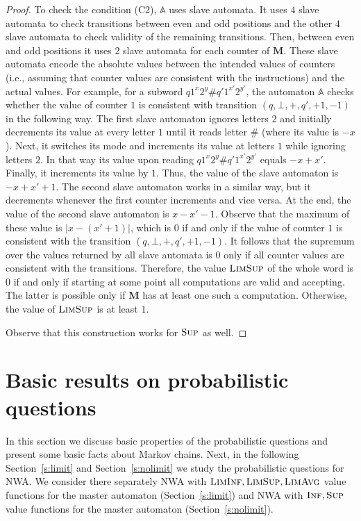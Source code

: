 \documentclass{lmcs}
\newcommand{\nestedA}{\mathbb{A}}
\newcommand{\flimavg}{\textsc{LimAvg}}
\newcommand{\fliminf}{\textsc{LimInf}}
\newcommand{\flimsup}{\textsc{LimSup}}
\newcommand{\fsup}{\textsc{Sup}}
\newcommand{\finf}{\textsc{Inf}}
\newcommand{\M}{\mathbf{M}}
\begin{document}
\begin{proof}
To check the condition (C2), $\nestedA$ uses slave automata.
It uses $4$ slave automata to check transitions between even and odd positions and the other $4$ slave automata to check validity of the remaining
transitions. Then, between even and odd positions it uses $2$ slave automata for each counter of $\M$.
These slave automata encode the absolute values between the intended values of counters (i.e., assuming that counter values are consistent with the instructions)
and the actual values.
For example, for a subword $q 1^x 2^y \# q' 1^{x'} 2^{y'}$, the automaton $\nestedA$ checks whether the value
of counter $1$ is consistent with transition $(q,\bot, +, q', +1, -1)$ in the following way.
The first slave automaton ignores letters $2$ and initially decrements its value at every letter $1$ until it reads letter $\#$ (where its value is $-x$).
Next, it switches its mode and increments its value at letters $1$ while ignoring letters $2$.
In that way its value upon reading $q 1^x 2^y \# q' 1^{x'} 2^{y'}$ equals $-x + x'$.
Finally, it increments its value by $1$.
Thus, the value of the slave automaton is $-x +x' +1$.
The second slave automaton works in a similar way, but it decrements whenever the first counter increments and vice versa.
 At the end, the value of the second slave automaton is
$x - x' -1$. Observe that the maximum of these value is $|x - (x'+1)|$, which is $0$ if and only if the value of counter $1$ is consistent with the transition
 $(q,\bot, +, q', +1, -1)$. It follows that the supremum over the values returned by all slave automata is $0$ only if all counter values are consistent with the transitions.
Therefore, the value $\flimsup$ of the whole word  is $0$ if and only if starting at some point all computations are valid and accepting.
The latter is possible only if $\M$ has at least one such a computation.
Otherwise, the value of $\flimsup$ is at least $1$.

Observe that this construction works for $\fsup$ as well.
\end{proof}





\section{Basic results on probabilistic questions}
In this section we discuss basic properties of the probabilistic questions and present some basic facts about Markov
chains. Next, in the following Section~\ref{s:limit} and Section~\ref{s:nolimit} we study the probabilistic questions for NWA\@.
We consider there separately NWA with $\fliminf, \flimsup, \flimavg$ value functions for the master automaton (Section~\ref{s:limit})
and NWA with $\finf, \fsup$ value functions for the master automaton (Section~\ref{s:nolimit}).
\end{document}
